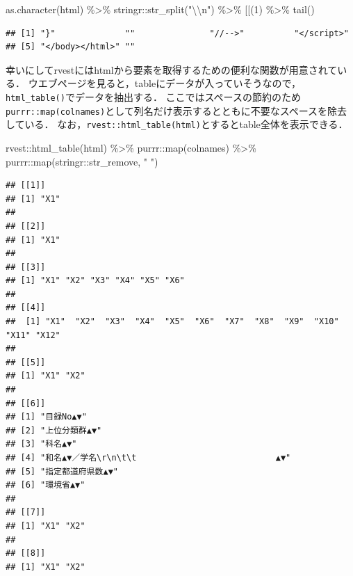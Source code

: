 \documentclass[
]{article}
\newenvironment{Shaded}{\begin{snugshade}}{\end{snugshade}}
\newcommand{\AttributeTok}[1]{\textcolor[rgb]{0.77,0.63,0.00}{#1}}
\newcommand{\DecValTok}[1]{\textcolor[rgb]{0.00,0.00,0.81}{#1}}
\newcommand{\FunctionTok}[1]{\textcolor[rgb]{0.00,0.00,0.00}{#1}}
\newcommand{\NormalTok}[1]{#1}
\newcommand{\SpecialCharTok}[1]{\textcolor[rgb]{0.00,0.00,0.00}{#1}}
\newcommand{\StringTok}[1]{\textcolor[rgb]{0.31,0.60,0.02}{#1}}
\begin{document}
\begin{Shaded}
\begin{Highlighting}[]
\FunctionTok{as.character}\NormalTok{(html) }\SpecialCharTok{\%\textgreater{}\%}
\NormalTok{  stringr}\SpecialCharTok{::}\FunctionTok{str\_split}\NormalTok{(}\StringTok{"}\SpecialCharTok{\textbackslash{}\textbackslash{}}\StringTok{n"}\NormalTok{) }\SpecialCharTok{\%\textgreater{}\%}
  \StringTok{\textasciigrave{}}\AttributeTok{[[}\StringTok{\textasciigrave{}}\NormalTok{(}\DecValTok{1}\NormalTok{) }\SpecialCharTok{\%\textgreater{}\%}
  \FunctionTok{tail}\NormalTok{()}
\end{Highlighting}
\end{Shaded}

\begin{verbatim}
## [1] "}"              ""               "//-->"          "</script>"     
## [5] "</body></html>" ""
\end{verbatim}

幸いにしてrvestにはhtmlから要素を取得するための便利な関数が用意されている．
ウエブページを見ると，tableにデータが入っていそうなので，\texttt{html\_table()}でデータを抽出する．
ここではスペースの節約のため\texttt{purrr::map(colnames)}として列名だけ表示するとともに不要なスペースを除去している．
なお，\texttt{rvest::html\_table(html)}とするとtable全体を表示できる．

\begin{Shaded}
\begin{Highlighting}[]
\NormalTok{rvest}\SpecialCharTok{::}\FunctionTok{html\_table}\NormalTok{(html) }\SpecialCharTok{\%\textgreater{}\%}
\NormalTok{  purrr}\SpecialCharTok{::}\FunctionTok{map}\NormalTok{(colnames) }\SpecialCharTok{\%\textgreater{}\%}
\NormalTok{  purrr}\SpecialCharTok{::}\FunctionTok{map}\NormalTok{(stringr}\SpecialCharTok{::}\NormalTok{str\_remove, }\StringTok{" "}\NormalTok{)}
\end{Highlighting}
\end{Shaded}

\begin{verbatim}
## [[1]]
## [1] "X1"
## 
## [[2]]
## [1] "X1"
## 
## [[3]]
## [1] "X1" "X2" "X3" "X4" "X5" "X6"
## 
## [[4]]
##  [1] "X1"  "X2"  "X3"  "X4"  "X5"  "X6"  "X7"  "X8"  "X9"  "X10" "X11" "X12"
## 
## [[5]]
## [1] "X1" "X2"
## 
## [[6]]
## [1] "目録No▲▼"                                            
## [2] "上位分類群▲▼"                                        
## [3] "科名▲▼"                                              
## [4] "和名▲▼／学名\r\n\t\t                            ▲▼"
## [5] "指定都道府県数▲▼"                                    
## [6] "環境省▲▼"                                            
## 
## [[7]]
## [1] "X1" "X2"
## 
## [[8]]
## [1] "X1" "X2"
\end{verbatim}
\end{document}
